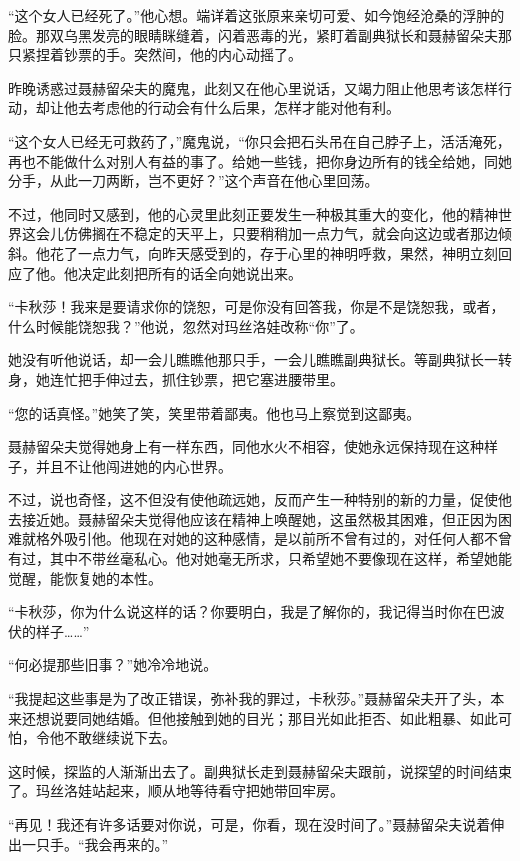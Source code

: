 \documentclass[12pt,UTF-8,openany]{ctexbook}
\begin{document}
\begin{normalsize}
    “这个女人已经死了。”他心想。端详着这张原来亲切可爱、如今饱经沧桑的浮肿的脸。那双乌黑发亮的眼睛眯缝着，闪着恶毒的光，紧盯着副典狱长和聂赫留朵夫那只紧捏着钞票的手。突然间，他的内心动摇了。
    
    昨晚诱惑过聂赫留朵夫的魔鬼，此刻又在他心里说话，又竭力阻止他思考该怎样行动，却让他去考虑他的行动会有什么后果，怎样才能对他有利。
    
    “这个女人已经无可救药了，”魔鬼说，“你只会把石头吊在自己脖子上，活活淹死，再也不能做什么对别人有益的事了。给她一些钱，把你身边所有的钱全给她，同她分手，从此一刀两断，岂不更好？”这个声音在他心里回荡。
    
    不过，他同时又感到，他的心灵里此刻正要发生一种极其重大的变化，他的精神世界这会儿仿佛搁在不稳定的天平上，只要稍稍加一点力气，就会向这边或者那边倾斜。他花了一点力气，向昨天感受到的，存于心里的神明呼救，果然，神明立刻回应了他。他决定此刻把所有的话全向她说出来。
    
    “卡秋莎！我来是要请求你的饶恕，可是你没有回答我，你是不是饶恕我，或者，什么时候能饶恕我？”他说，忽然对玛丝洛娃改称“你”了。
    
    她没有听他说话，却一会儿瞧瞧他那只手，一会儿瞧瞧副典狱长。等副典狱长一转身，她连忙把手伸过去，抓住钞票，把它塞进腰带里。
    
    “您的话真怪。”她笑了笑，笑里带着鄙夷。他也马上察觉到这鄙夷。
    
    聂赫留朵夫觉得她身上有一样东西，同他水火不相容，使她永远保持现在这种样子，并且不让他闯进她的内心世界。
    
    不过，说也奇怪，这不但没有使他疏远她，反而产生一种特别的新的力量，促使他去接近她。聂赫留朵夫觉得他应该在精神上唤醒她，这虽然极其困难，但正因为困难就格外吸引他。他现在对她的这种感情，是以前所不曾有过的，对任何人都不曾有过，其中不带丝毫私心。他对她毫无所求，只希望她不要像现在这样，希望她能觉醒，能恢复她的本性。
    
    “卡秋莎，你为什么说这样的话？你要明白，我是了解你的，我记得当时你在巴波伏的样子……”
    
    “何必提那些旧事？”她冷冷地说。
    
    “我提起这些事是为了改正错误，弥补我的罪过，卡秋莎。”聂赫留朵夫开了头，本来还想说要同她结婚。但他接触到她的目光；那目光如此拒否、如此粗暴、如此可怕，令他不敢继续说下去。
    
    这时候，探监的人渐渐出去了。副典狱长走到聂赫留朵夫跟前，说探望的时间结束了。玛丝洛娃站起来，顺从地等待看守把她带回牢房。
    
    “再见！我还有许多话要对你说，可是，你看，现在没时间了。”聂赫留朵夫说着伸出一只手。“我会再来的。”
    

\end{normalsize}
\end{document}
